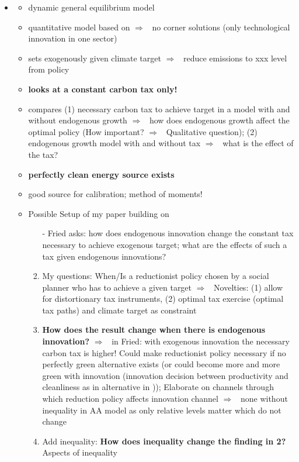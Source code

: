 \documentclass[12pt]{article}
\newcommand{\ar}{$\Rightarrow$ \ }
\begin{document}
\begin{itemize}
\begin{itemize}
\end{itemize}
\item \cite{Fried2018ClimateAnalysis}
\begin{itemize}
\item dynamic general equilibrium model
\item quantitative model based on \cite{Acemoglu2012TheChange} \ar no corner solutions (only technological innovation in one sector)
\item sets exogenously given climate target \ar reduce emissions to xxx level from policy
\item \textbf{looks at a constant carbon tax only!}
\item compares (1) necessary carbon tax to achieve target in a model with and without endogenous growth \ar how does endogenous growth affect the optimal policy (How important? \ar Qualitative question); (2) endogenous growth model with and without tax \ar what is the effect of the tax?
\item \textbf{perfectly clean energy source exists}
\item good source for calibration; method of moments!
\item Possible Setup of my paper building on \cite{Fried2018ClimateAnalysis}
\begin{enumerate}
\item[-] Fried asks: how does endogenous innovation change the constant tax necessary to achieve exogenous target; what are the effects of such a tax given endogenous innovations?
\item My questions: When/Is a reductionist policy chosen by a social planner who has to achieve a given target \ar Novelties: (1) allow for distortionary tax instruments, (2) optimal tax exercise (optimal tax paths) and climate target as constraint 
\item \textbf{How does the result change when there is endogenous innovation?} \ar in Fried: with exogenous innovation the necessary carbon tax is higher! Could make reductionist policy necessary if no perfectly green alternative exists (or could become more and more green with innovation (innovation decision between productivity and cleanliness as in alternative in \cite{Acemoglu2012TheChange})); Elaborate on channels through which reduction policy affects innovation channel \ar none without inequality in AA model as only relative levels matter which do not change
\item Add inequality: \textbf{How does inequality change the finding in 2?} Aspects of inequality

\end{enumerate}
\end{itemize}
\end{itemize}
\end{document}
